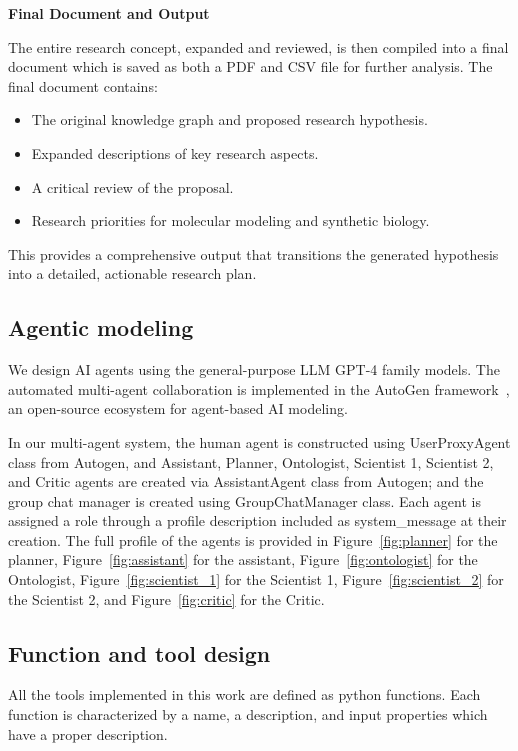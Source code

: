 \documentclass{article}
\begin{document}
\textbf{Final Document and Output}

The entire research concept, expanded and reviewed, is then compiled into a final document which is saved as both a PDF and CSV file for further analysis. The final document contains:
\begin{itemize}
    \item The original knowledge graph and proposed research hypothesis.
    \item Expanded descriptions of key research aspects.
    \item A critical review of the proposal.
    \item Research priorities for molecular modeling and synthetic biology.
\end{itemize}
This provides a comprehensive output that transitions the generated hypothesis into a detailed, actionable research plan.

\subsection{Agentic modeling}
We design AI agents using the general-purpose LLM GPT-4 family models. The automated multi-agent collaboration is implemented in the AutoGen framework~\cite{Wu2023}, an open-source ecosystem for agent-based AI modeling. 

In our multi-agent system, the human agent is
constructed using UserProxyAgent class from Autogen, and
Assistant, Planner, Ontologist, Scientist 1, Scientist 2, and Critic agents are created via AssistantAgent
class from Autogen; and the group chat manager is created
using GroupChatManager class. Each agent is assigned a role
through a profile description included as system\_message at their creation. The full profile of the agents is provided in Figure~\ref{fig:planner} for the planner, Figure~\ref{fig:assistant} for the assistant, Figure~\ref{fig:ontologist} for the Ontologist, Figure~\ref{fig:scientist_1} for the Scientist 1, Figure~\ref{fig:scientist_2} for the Scientist 2, and Figure~\ref{fig:critic} for the Critic. 

\subsection{Function and tool design}
All the tools implemented in this work are defined as python
functions. Each function is characterized by a name, a description, and input properties which have a proper description.
\end{document}
